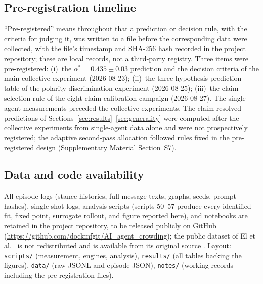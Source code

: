 \documentclass{ieeeaccess}
\newcommand{\astar}{\alpha^{*}}
\begin{document}
\subsection{Pre-registration timeline}

``Pre-registered'' means throughout that a prediction or decision rule, with
the criteria for judging it, was written to a file before the corresponding
data were collected, with the file's timestamp and SHA-256 hash recorded in
the project repository; these are local records, not a third-party registry.
Three items were pre-registered: (i)~the $\astar = 0.435 \pm 0.03$ prediction
and the decision criteria of the main collective experiment (2026-08-23);
(ii)~the three-hypothesis prediction table of the polarity discrimination
experiment (2026-08-25); (iii)~the claim-selection rule of the eight-claim
calibration campaign (2026-08-27). The single-agent measurements preceded
the collective experiments. The claim-resolved predictions of
Sections~\ref{sec:results}--\ref{sec:generality} were computed after the
collective experiments from single-agent data alone and were not
prospectively registered; the adaptive second-pass allocation followed rules
fixed in the pre-registered design (Supplementary Material Section~S7).

\subsection{Data and code availability}

All episode logs (stance histories, full message texts, graphs, seeds, prompt
hashes), single-shot logs, analysis scripts (scripts 50--57 produce every
identified fit, fixed point, surrogate rollout, and figure reported here), and
notebooks are retained in the project repository, to be released publicly on GitHub
(\url{https://github.com/dockmfgit/AI_agent_crowding}); the public
dataset of El et al.~\cite{El2026} is not redistributed and is available from its
original source \cite{El2026data}. Layout: \texttt{scripts/} (measurement, engines, analysis),
\texttt{results/} (all tables backing the figures), \texttt{data/}
(raw JSONL and episode JSON), \texttt{notes/} (working records including the
pre-registration files).
\end{document}
